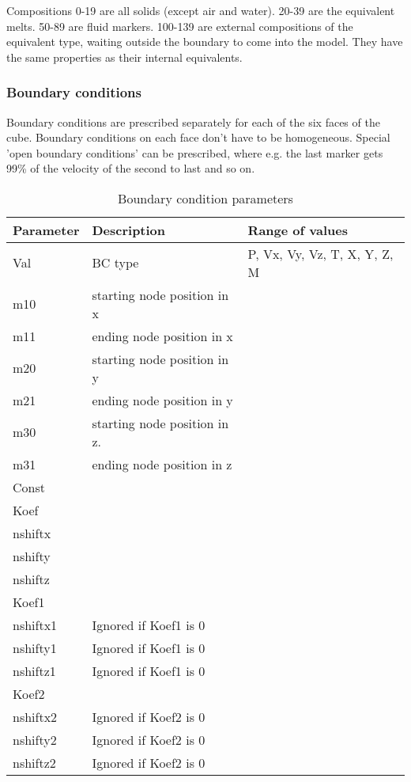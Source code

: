 \begin{table}[H]
Compositions 0-19 are all solids (except air and water). 20-39 are the equivalent melts. 50-89 are fluid markers. 100-139 are external compositions of the equivalent type, waiting outside the boundary to come into the model. They have the same properties as their internal equivalents.

\subsubsection{Boundary conditions}
Boundary conditions are prescribed separately for each of the six faces of the cube. Boundary conditions on each face don't have to be homogeneous.
Special 'open boundary conditions' can be prescribed, where e.g. the last marker gets 99\% of the velocity of the second to last and so on.

\begin{table}[H]
\small
\centering
\begin{tabular}{l l l}
\toprule
Parameter & Description & Range of values \\
\midrule
Val & BC type & P, Vx, Vy, Vz, T, X, Y, Z, M \\
m10 & starting node position in x &  \\ 
m11 & ending node position in x &  \\ 
m20 & starting node position in y &  \\ 
m21 & ending node position in y &  \\ 
m30 & starting node position in z. &  \\ 
m31 & ending node position in z &  \\ 
Const &  &  \\ 
Koef &  &  \\ 
nshiftx &  &  \\ 
nshifty &  &  \\ 
nshiftz &  &  \\ 
Koef1 &  &  \\ 
nshiftx1 & Ignored if Koef1 is 0 &  \\ 
nshifty1 & Ignored if Koef1 is 0 &  \\ 
nshiftz1 & Ignored if Koef1 is 0 &  \\ 
Koef2 &  &  \\ 
nshiftx2 & Ignored if Koef2 is 0 &  \\ 
nshifty2 & Ignored if Koef2 is 0 &  \\ 
nshiftz2 & Ignored if Koef2 is 0 &  \\ 
\bottomrule
\end{tabular}
\caption{Boundary condition parameters}
\label{tbl:BC_parameters}
\end{table}


\end{table}
